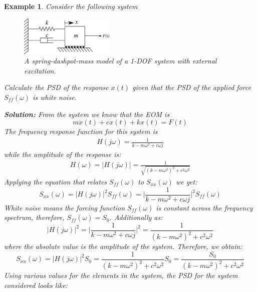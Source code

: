 \documentclass[12pt,letter]{article}
\newtheorem{ex}{Example}
\numberwithin{ex}{section} %
\newenvironment{example}{\begin{mdframed}[middlelinewidth=0.5mm]\begin{ex}\normalfont}{\end{ex}\end{mdframed}}
\numberwithin{re}{section} %
\begin{document}
\begin{example}
	Consider the following system
	\begin{figure}[H]
		\centering
		\includegraphics[width=0.4\textwidth]{../Figures/forced_spring_mass_damper_system.png}
		\caption{A spring-dashpot-mass model of a 1-DOF system with external excitation.}
	\end{figure}
	Calculate the PSD of the response $x(t)$ given that the PSD of the applied force $S_{ff}(\omega)$ is white noise. 
	
	\noindent\textbf{Solution:} From the system we know that the EOM is 
	\begin{equation}
	m\ddot{x}(t) +c\dot{x}(t) + kx(t) = F(t)
	\end{equation} 
	The frequency response function for this system is 
	\begin{eqnarray}
		H(j\omega) = \frac{1}{k-m\omega^2+c\omega j}
	\end{eqnarray}
	while the amplitude of the response is:
	\begin{eqnarray}
	H(\omega) = |H(j\omega)| = \frac{1}{\sqrt{(k-m\omega^2)^2+c^2\omega^2}}
	\end{eqnarray}
	Applying the equation that relates $S_{ff}(\omega)$ to $S_{xx}(\omega)$ we get:
	\begin{equation}
	S_{xx}(\omega) =  |H(j\omega)|^2 S_{ff}(\omega) = \bigg|\frac{1}{k-m\omega^2+c\omega j} \bigg|^2 S_{ff}(\omega) 
	\end{equation}
	White noise means the forcing function $S_{ff}(\omega)$ is constant across the frequency spectrum, therefore, $S_{ff}(\omega)=S_0$. Additionally as:
	\begin{equation}
	|H(j\omega)|^2 = \bigg|\frac{1}{k-m\omega^2+c\omega j} \bigg|^2 = \frac{1}{(k-m\omega^2)^2+c^2\omega^2}
	\end{equation}
	where the absolute value is the amplitude of the system. Therefore, we obtain:
	\begin{equation}
	S_{xx}(\omega) =  |H(j\omega)|^2 S_{0}= \frac{1}{(k-m\omega^2)^2+c^2\omega^2}S_0 = \frac{S_0}{(k-m\omega^2)^2+c^2\omega^2}
	\end{equation}
	Using various values for the elements in the system, the PSD for the system considered looks like:
	\begin{figure}[H]

\end{figure}
\end{example}
\end{document}
